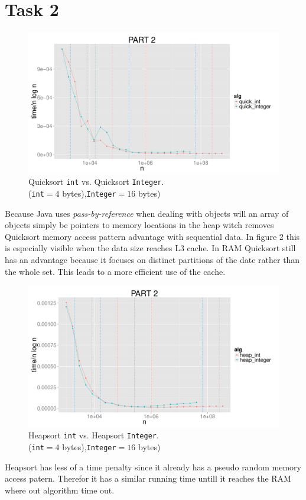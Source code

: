 \documentclass{article}
\begin{document}
\section*{Task 2}
\begin{figure}[H]
    \centering
    \includegraphics[width=
    \textwidth]{images/part2_quick.pdf}
    \caption{Quicksort \texttt{int} vs. Quicksort \texttt{Integer}. 
    \\(\texttt{int}$= 4$ bytes),\texttt{Integer}$= 16$ bytes)}
    \label{fig:awesome_image}
\end{figure}
Because Java uses \textit{pass-by-reference} when dealing with objects will an 
array of objects simply be pointers to memory locations in the heap witch 
removes Quicksort memory access pattern advantage with sequential data.
In figure 2 this is especially visible when the data size reaches L3 cache. In 
RAM Quicksort still has an advantage because it focuses on distinct partitions
of the date rather than the whole set. This leads to a more efficient use of the 
cache.
\begin{figure}[H]
    \centering
    \includegraphics[width=
    \textwidth]{images/part2_heap.pdf}
    \caption{Heapsort \texttt{int} vs. Heapsort \texttt{Integer}. 
    \\(\texttt{int}$= 4$ bytes),\texttt{Integer}$= 16$ bytes)}
    \label{fig:awesome_image}
\end{figure}
Heapsort has less of a time penalty since it already has a pseudo random memory 
access patern. Therefor it has a similar running time untill it reaches the RAM
where out algorithm time out. 
\newpage
\end{document}
